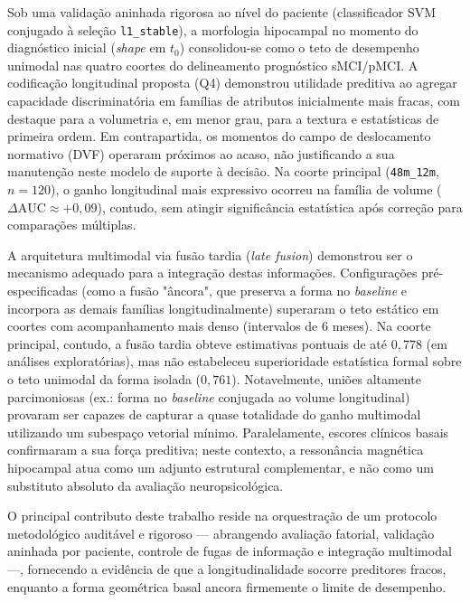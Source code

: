 \documentclass[review]{elsarticle}
\newcommand{\code}[1]{\texttt{#1}}
\begin{document}
Sob uma validação aninhada rigorosa ao nível do paciente (classificador SVM conjugado à seleção \code{l1\_stable}), a morfologia hipocampal no momento do diagnóstico inicial (\emph{shape} em $t_0$) consolidou-se como o teto de desempenho unimodal nas quatro coortes do delineamento prognóstico sMCI/pMCI. A codificação longitudinal proposta (Q4) demonstrou utilidade preditiva ao agregar capacidade discriminatória em famílias de atributos inicialmente mais fracas, com destaque para a volumetria e, em menor grau, para a textura e estatísticas de primeira ordem. Em contrapartida, os momentos do campo de deslocamento normativo (DVF) operaram próximos ao acaso, não justificando a sua manutenção neste modelo de suporte à decisão. Na coorte principal (\code{48m\_12m}, $n=120$), o ganho longitudinal mais expressivo ocorreu na família de volume ($\Delta\mathrm{AUC}\approx +0{,}09$), contudo, sem atingir significância estatística após correção para comparações múltiplas.

A arquitetura multimodal via fusão tardia (\emph{late fusion}) demonstrou ser o mecanismo adequado para a integração destas informações. Configurações pré-especificadas (como a fusão "âncora", que preserva a forma no \textit{baseline} e incorpora as demais famílias longitudinalmente) superaram o teto estático em coortes com acompanhamento mais denso (intervalos de 6 meses). Na coorte principal, contudo, a fusão tardia obteve estimativas pontuais de até $0,778$ (em análises exploratórias), mas não estabeleceu superioridade estatística formal sobre o teto unimodal da forma isolada ($0,761$). Notavelmente, uniões altamente parcimoniosas (ex.: forma no \textit{baseline} conjugada ao volume longitudinal) provaram ser capazes de capturar a quase totalidade do ganho multimodal utilizando um subespaço vetorial mínimo. Paralelamente, escores clínicos basais confirmaram a sua força preditiva; neste contexto, a ressonância magnética hipocampal atua como um adjunto estrutural complementar, e não como um substituto absoluto da avaliação neuropsicológica.

O principal contributo deste trabalho reside na orquestração de um protocolo metodológico auditável e rigoroso — abrangendo avaliação fatorial, validação aninhada por paciente, controle de fugas de informação e integração multimodal —, fornecendo a evidência de que a longitudinalidade socorre preditores fracos, enquanto a forma geométrica basal ancora firmemente o limite de desempenho.
\end{document}
